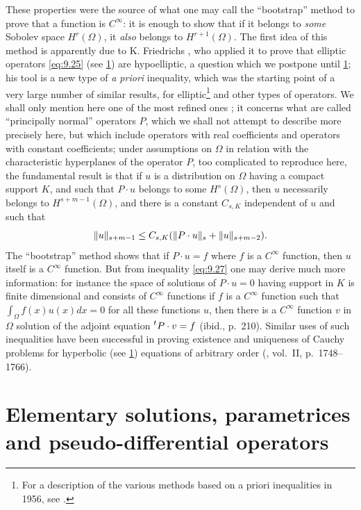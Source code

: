 \documentclass[12pt,a4paper,leqno,twoside]{extbook}
\DeclarePairedDelimiter{\norm}{\lVert}{\rVert}
\begin{document}
These properties were the source of what one may call the ``bootstrap'' method to prove that a function is \(C^\infty\): it is enough to show that if it belongs to \emph{some} Sobolev space \(H^r(\Omega)\), it \emph{also} belongs to \(H^{r+1}(\Omega)\). The first idea of this method is apparently due to K. Friedrichs \cite{077}, who applied it to prove that elliptic operators \eqref{eq:9.25} (see \ref{sec:9.5}) are hypoelliptic, a question which we postpone until \ref{sec:9.5}; his tool is a new type of \emph{a priori} inequality, which was the starting point of a very large number of similar results, for elliptic\footnote{For a description of the various methods based on a priori inequalities in 1956, see \cite{168}.} and other types of operators. We shall only mention here one of the most refined ones \cite[p.~207]{117}; it concerns what are called ``principally normal'' operators \(P\), which we shall not attempt to describe more precisely here, but which include operators with real coefficients and operators with constant coefficients; under assumptions on \(\Omega\) in relation with the characteristic hyperplanes of the operator \(P\), too complicated to reproduce here, the fundamental result is that if \(u\) is a distribution on \(\Omega\) having a compact support \(K\), and such that \(P \cdot u\) belongs to some \(H^s(\Omega)\), then \(u\) necessarily belongs to \(H^{s+m-1}(\Omega)\), and there is a constant \(C_{s,K}\) independent of \(u\) and such that
\begin{equation}
    \label{eq:9.27}
    \norm{u}_{s+m-1} \leq C_{s,K}(\norm{P \cdot u}_s + \norm{u}_{s+m-2}).
\end{equation}
The ``bootstrap'' method shows that if \(P \cdot u = f\) where \(f\) is a \(C^\infty\) function, then \(u\) itself is a \(C^\infty\) function. But from inequality \eqref{eq:9.27} one may derive much more information: for instance the space of solutions of \(P \cdot u = 0\) having support in \(K\) is finite dimensional and consists of \(C^\infty\) functions if \(f\) is a \(C^\infty\) function such that \(\int_\Omega f(x)u(x)dx = 0\) for all these functions \(u\), then there is a \(C^\infty\) function \(v\) in \(\Omega\) solution of the adjoint equation \(\prescript{t}{}P \cdot v = f\) (ibid., p.~210). Similar uses of such inequalities have been successful in proving existence and uniqueness of Cauchy problems for hyperbolic (see \ref{sec:9.5}) equations of arbitrary order (\cite{062}, vol.~II, p.~1748--1766).

\section{Elementary solutions, parametrices and pseudo-differential operators}
\label{sec:9.5}
\end{document}
